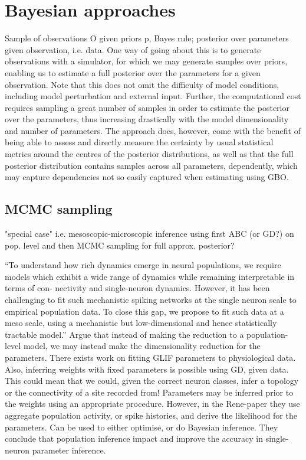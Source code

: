 \documentclass[mphil,deptreport,ai]{infthesis} %
\begin{document}
\section{Bayesian approaches}

Sample of observations O given priors p, Bayes rule; posterior over parameters given observation, i.e. data.
One way of going about this is to generate observations with a simulator, for which we may generate samples over priors, enabling us to estimate a full posterior over the parameters for a given observation.
Note that this does not omit the difficulty of model conditions, including model perturbation and external input.
Further, the computational cost requires sampling a great number of samples in order to estimate the posterior over the parameters, thus increasing drastically with the model dimensionality and number of parameters.
The approach does, however, come with the benefit of being able to assess and directly measure the certainty by usual statistical metrics around the centres of the posterior distributions, as well as that the full posterior distribution contains samples across all parameters, dependently, which may capture dependencies not so easily captured when estimating using GBO.

\subsection{MCMC sampling}
\cite{Rene2020} "special case" i.e. mesoscopic-microscopic inference using first ABC (or GD?) on pop. level and then MCMC sampling for full approx. posterior?

“To understand how rich dynamics emerge in neural populations, we require models which exhibit a wide range of dynamics while remaining interpretable in terms of con- nectivity and single-neuron dynamics. However, it has been challenging to fit such mechanistic spiking networks at the single neuron scale to empirical population data. To close this gap, we propose to fit such data at a meso scale, using a mechanistic but low-dimensional and hence statistically tractable model.”
Argue that instead of making the reduction to a population-level model, we may instead make the dimensionality reduction for the parameters.
There exists work on fitting GLIF parameters to physiological data. 
Also, inferring weights with fixed parameters is possible using GD, given data.
This could mean that we could, given the correct neuron classes, infer a topology or the connectivity of a site recorded from!
Parameters may be inferred prior to the weights using an appropriate procedure.
However, in the Rene-paper they use aggregate population activity, or spike histories, and derive the likelihood for the parameters. Can be used to either optimise, or do Bayesian inference.
They conclude that population inference impact and improve the accuracy in single-neuron parameter inference.
\end{document}
